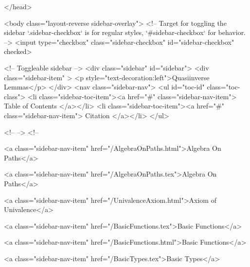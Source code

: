   
</head>




  <body class="layout-reverse sidebar-overlay">
    <!-- Target for toggling the sidebar `.sidebar-checkbox` is for regular
     styles, `#sidebar-checkbox` for behavior. -->
<input type="checkbox" class="sidebar-checkbox" id="sidebar-checkbox" checked>

<!-- Toggleable sidebar -->
<div class="sidebar" id="sidebar">
  <div class="sidebar-item" >
    <p style="text-decoration:left">Quasiinverse Lemmas</p>
  </div>
  <nav class="sidebar-nav">
    <ul id="toc-id" class="toc-class">
  <li class="sidebar-toc-item"><a href="#" class="sidebar-nav-item"> Table of Contents </a></li>
  <li class="sidebar-toc-item"><a href="#" class="sidebar-nav-item"> Citation </a></li>
</ul>


    <!--  -->
    <!-- 
      
    
      
    
      
    
      
        
      
    
      
        
          <a class="sidebar-nav-item" href="/AlgebraOnPaths.html">Algebra On Paths</a>
        
      
    
      
        
          <a class="sidebar-nav-item" href="/AlgebraOnPaths.tex">Algebra On Paths</a>
        
      
    
      
        
          <a class="sidebar-nav-item" href="/UnivalenceAxiom.html">Axiom of Univalence</a>
        
      
    
      
        
          <a class="sidebar-nav-item" href="/BasicFunctions.tex">Basic Functions</a>
        
      
    
      
        
          <a class="sidebar-nav-item" href="/BasicFunctions.html">Basic Functions</a>
        
      
    
      
        
          <a class="sidebar-nav-item" href="/BasicTypes.tex">Basic Types</a>
        
      
    
      
        
